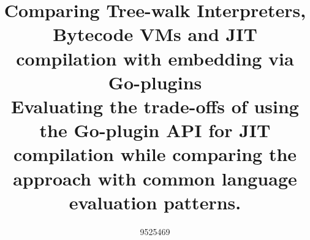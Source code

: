 

\title{Comparing Tree-walk Interpreters, Bytecode VMs and JIT compilation with embedding via Go-plugins \\[1\baselineskip] \small{Evaluating the trade-offs of using the Go-plugin API for JIT compilation while comparing the approach with common language evaluation patterns.}}
\author{9525469}


    \maketitle
    \tableofcontents

    


    
    
    
    
    
    


    \printbibliography


